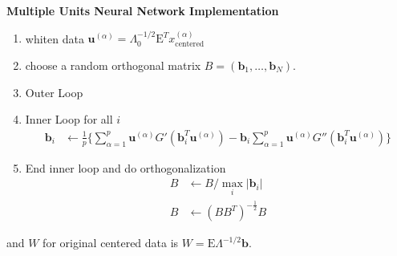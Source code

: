 \textbf{Multiple Units Neural Network Implementation}
\begin{enumerate}
	\item whiten data $\boldsymbol{u}^{(\alpha)} = \Lambda_0^{-1/2}\text{E}^Tx_{\text{centered}}^{(\alpha)} $ 
	\item choose a random orthogonal matrix $B = (\boldsymbol{b}_1, \dots, \boldsymbol{b}_N)$.
	\item Outer Loop
	\item Inner Loop for all $i$
\begin{align*}
	\boldsymbol{b}_i &\leftarrow \frac{1}{p} \Bigg \{ \sum_{\alpha=1}^{p} \boldsymbol{u}^{(\alpha)} G'(\boldsymbol{b}_i^T\boldsymbol{u}^{(\alpha)}) - \boldsymbol{b}_i\sum_{\alpha=1}^{p} \boldsymbol{u}^{(\alpha)} G''(\boldsymbol{b}^T_i\boldsymbol{u}^{(\alpha)})  \Bigg \} 
\end{align*}
\item End inner loop and do orthogonalization
\begin{align*}
	B &\leftarrow B / \max_i |\boldsymbol{b}_i| \\
	B &\leftarrow (B B^T)^{-\frac{1}{2}} B
\end{align*}
\end{enumerate}
and $W$ for original centered data is $W = \text{E} \Lambda^{-1/2} \boldsymbol{b}$.


